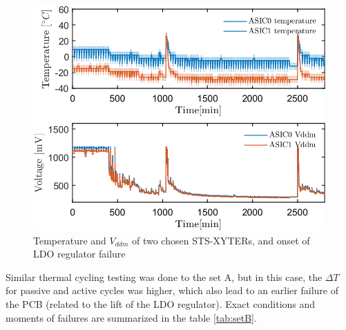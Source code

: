 \begin{figure}[!h]
\centering
\includegraphics[width=0.6\columnwidth]{Chapter4/images/temps_vddm.png}
\caption{Temperature and $V_{ddm}$ of two chosen \gls{STS}-XYTERs, and onset of \gls{LDO} regulator failure}
\label{fig_cold_startup_vddm}
\end{figure}

Similar thermal cycling testing was done to the set A, but in this case, the $\Delta T$ for passive and active cycles was higher, which also lead to an earlier failure of the \gls{PCB} (related to the lift of the \gls{LDO} regulator). Exact conditions and moments of failures are summarized in the table \ref{tab:setB}.

